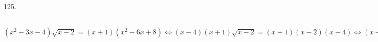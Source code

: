 125. $(x^2-3x-4)\sqrt{x-2}=(x+1)(x^2-6x+8)\Leftrightarrow(x-4)(x+1)\sqrt{x-2}=(x+1)(x-2)(x-4)\Leftrightarrow
(x-4)(x+1)(\sqrt{x-2}-x+2)=0\Leftrightarrow
\begin{cases}\left[\begin{array}{l} x=4,\\ x=-1,\\ \sqrt{x-2}=x-2.\end{array}
ight.\\ x\geqslant2.\end{cases}\Leftrightarrow
\begin{cases}\left[\begin{array}{l} x=4,\\ x-2=x^2-4x+4.\end{array}
ight.\\ x\geqslant2.\end{cases}\Leftrightarrow
\begin{cases}\left[\begin{array}{l} x=4,\\ (x-2)(x-3)=0.\end{array}
ight.\\ x\geqslant2.\end{cases}\Leftrightarrow x\in\{2;3;4\}$\\
